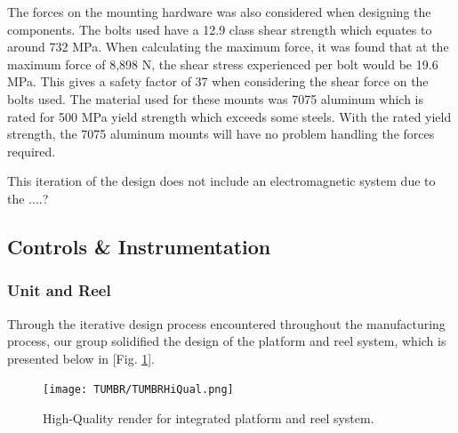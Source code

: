 The forces on the mounting hardware was also considered when designing the components. The bolts used have a 12.9 class shear strength which equates to around 732 MPa. When calculating the maximum force, it was found that at the maximum force of 8,898 N, the shear stress experienced per bolt would be 19.6 MPa. This gives a safety factor of 37 when considering the shear force on the bolts used. The material used for these mounts was 7075 aluminum which is rated for 500 MPa yield strength which exceeds some steels. With the rated yield strength, the 7075 aluminum mounts will have no problem handling the forces required.

This iteration of the design does not include an electromagnetic system due to the ....?


\subsection{Controls \& Instrumentation}



\subsubsection{Unit and Reel}

\indent\indent Through the iterative design process encountered throughout the manufacturing process, our group solidified the design of the platform and reel system, which is presented below in [Fig. \ref{fig:TUMBRHiQual}]. 

\begin{figure}[ht]
  \centering
  \texttt{[image: TUMBR/TUMBRHiQual.png]}
  \caption{\label{fig:TUMBRHiQual}High-Quality render for integrated platform and reel system.}
\end{figure}

